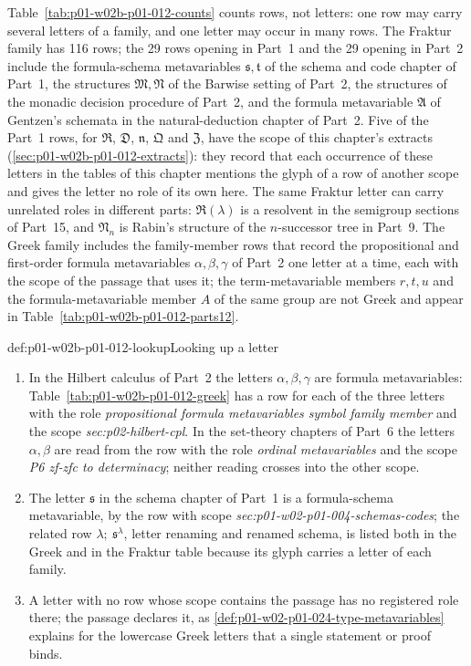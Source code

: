 Table~\ref{tab:p01-w02b-p01-012-counts} counts rows, not letters: one row
may carry several letters of a family, and one letter may occur in many
rows.  The Fraktur family has 116 rows; the
29 rows opening in Part~1 and the 29
opening in Part~2 include the formula-schema metavariables
\(\mathfrak s,\mathfrak t\) of the schema and code chapter of Part~1, the
structures \(\mathfrak M,\mathfrak N\) of the Barwise setting of Part~2,
the structures of the monadic decision procedure of Part~2, and the
formula metavariable \(\mathfrak A\) of Gentzen's schemata in the
natural-deduction chapter of Part~2.  Five of the Part~1 rows, for
\(\mathfrak R\), \(\mathfrak D\), \(\mathfrak n\), \(\mathfrak Q\) and
\(\mathfrak Z\), have the scope of this chapter's extracts
(\cref{sec:p01-w02b-p01-012-extracts}): they record that each occurrence
of these letters in the tables of this chapter mentions the glyph of a row
of another scope and gives the letter no role of its own here.  The same
Fraktur letter can carry
unrelated roles in different parts: \(\mathfrak R(\lambda)\) is a resolvent
in the semigroup sections of Part~15, and \(\mathfrak N_n\) is Rabin's
structure of the \(n\)-successor tree in Part~9.  The
Greek family includes the family-member rows that record the propositional
and first-order formula metavariables \(\alpha,\beta,\gamma\) of Part~2
one letter at a time, each with the scope of the passage that uses it; the
term-metavariable members \(r,t,u\) and the formula-metavariable member
\(A\) of the same group are not Greek and appear in
Table~\ref{tab:p01-w02b-p01-012-parts12}.

\begin{hbexample}{def:p01-w02b-p01-012-lookup}{Looking up a letter}
\begin{enumerate}
\item In the Hilbert calculus of Part~2 the letters \(\alpha,\beta,\gamma\)
  are formula metavariables: Table~\ref{tab:p01-w02b-p01-012-greek} has a
  row for each of the three letters with the role \emph{propositional
  formula metavariables symbol family member} and the scope
  \emph{sec:p02-hilbert-cpl}.  In the set-theory chapters of Part~6 the
  letters \(\alpha,\beta\) are read from the row with the role
  \emph{ordinal metavariables} and the scope \emph{P6 zf-zfc to
  determinacy}; neither reading crosses into the other scope.
\item The letter \(\mathfrak s\) in the schema chapter of Part~1 is a
  formula-schema metavariable, by the row with scope
  \emph{sec:p01-w02-p01-004-schemas-codes}; the related row
  \(\lambda;\ \mathfrak s^{\lambda}\), letter renaming and renamed schema,
  is listed both in the Greek and in the Fraktur table because its glyph
  carries a letter of each family.
\item A letter with no row whose scope contains the passage has no
  registered role there; the passage declares it, as
  \cref{def:p01-w02-p01-024-type-metavariables} explains for the
  lowercase Greek letters that a single statement or proof binds.
\end{enumerate}
\end{hbexample}

